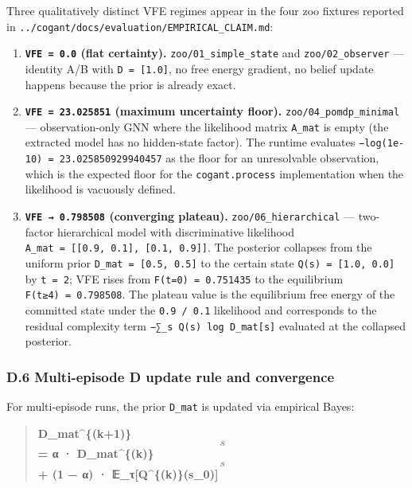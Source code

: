 \documentclass[
]{article}
\begin{document}
Three qualitatively distinct VFE regimes appear in the four zoo fixtures
reported in \texttt{../cogant/docs/evaluation/EMPIRICAL\_CLAIM.md}:

\begin{enumerate}
\def\labelenumi{\arabic{enumi}.}
\item
  \textbf{\texttt{VFE\ =\ 0.0} (flat certainty).}
  \texttt{zoo/01\_simple\_state} and \texttt{zoo/02\_observer} ---
  identity A/B with \texttt{D\ =\ {[}1.0{]}}, no free energy gradient,
  no belief update happens because the prior is already exact.
\item
  \textbf{\texttt{VFE\ =\ 23.025851} (maximum uncertainty floor).}
  \texttt{zoo/04\_pomdp\_minimal} --- observation-only GNN where the
  likelihood matrix \texttt{A\_mat} is empty (the extracted model has no
  hidden-state factor). The runtime evaluates
  \texttt{−log(1e-10)\ =\ 23.025850929940457} as the floor for an
  unresolvable observation, which is the expected floor for the
  \texttt{cogant.process} implementation when the likelihood is
  vacuously defined.
\item
  \textbf{\texttt{VFE\ →\ 0.798508} (converging plateau).}
  \texttt{zoo/06\_hierarchical} --- two-factor hierarchical model with
  discriminative likelihood
  \texttt{A\_mat\ =\ {[}{[}0.9,\ 0.1{]},\ {[}0.1,\ 0.9{]}{]}}. The
  posterior collapses from the uniform prior
  \texttt{D\_mat\ =\ {[}0.5,\ 0.5{]}} to the certain state
  \texttt{Q(s)\ =\ {[}1.0,\ 0.0{]}} by \texttt{t\ =\ 2}; VFE rises from
  \texttt{F(t=0)\ =\ 0.751435} to the equilibrium
  \texttt{F(t≥4)\ =\ 0.798508}. The plateau value is the equilibrium
  free energy of the committed state under the \texttt{0.9\ /\ 0.1}
  likelihood and corresponds to the residual complexity term
  \texttt{−∑\_s\ Q(s)\ log\ D\_mat{[}s{]}} evaluated at the collapsed
  posterior.
\end{enumerate}

\subsubsection{D.6 Multi-episode D update rule and
convergence}\label{d.6-multi-episode-d-update-rule-and-convergence}

For multi-episode runs, the prior \texttt{D\_mat} is updated via
empirical Bayes:

\begin{quote}
\textbf{D\_mat\^{}\{(k+1)\}\[s\] = α · D\_mat\^{}\{(k)\}\[s\] + (1 −
α) · 𝔼\_τ{[}Q\^{}\{(k)\}(s\_0){]}}
\end{quote}
\end{document}
